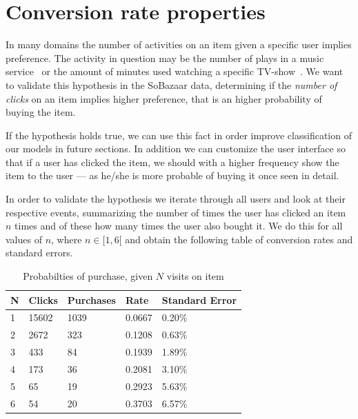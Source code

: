 

\clearpage
\section{Conversion rate properties}
\label{sec:conv-rate}

In many domains the number of activities on an item given a specific user
implies preference. The activity in question may be the number of plays in a
music service~\cite{parra2011walk} or the amount of minutes used watching a
specific TV-show~\cite{study-on-implicit-tv}. We want to validate this
hypothesis in the SoBazaar data, determining if the \textit{number of clicks}
on an item implies higher preference, that is an higher probability of buying
the item.



If the hypothesis holds true, we can use this fact in order improve
classification of our models in future sections. In addition we can customize
the user interface so that if a user has clicked the item, we should with a
higher frequency show the item to the user --- as he/she is more probable of
buying it once seen in detail.

In order to validate the hypothesis we iterate through all users and look at
their respective events, summarizing the number of times the user has clicked
an item $n$ times and of these how many times the user also bought it. We do
this for all values of $n$, where $n \in [1,6[$ and obtain the following table
of conversion rates and standard errors.

\begin{table}[H]
  \centering
  \begin{tabular}{lllll}
    \toprule
    N & Clicks & Purchases & Rate & Standard Error \\
    \midrule
    1 & 15602 & 1039  & 0.0667 & 0.20\% \\
    2 & 2672  & 323   & 0.1208 & 0.63\% \\
    3 & 433   & 84    & 0.1939 & 1.89\% \\
    4 & 173   & 36    & 0.2081 & 3.10\% \\
    5 & 65    & 19    & 0.2923 & 5.63\% \\
    6 & 54    & 20    & 0.3703 & 6.57\% \\
    \bottomrule
  \end{tabular}
  \label{tab:prob-purchase}
  \caption{Probabilties of purchase, given $N$ visits on item}
\end{table}

